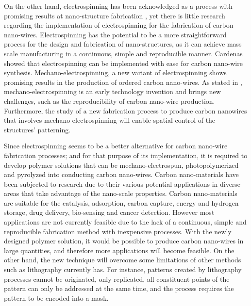 On the other hand, electrospinning has been acknowledged as a process with promising results at nano-structure fabrication \cite{Boer2014}, yet there is little research regarding the implementation of electrospinning for the fabrication of carbon nano-wires. Electrospinning has the potential to be a more straightforward process for the design and fabrication of nano-structures, as it can achieve mass scale manufacturing in a continuous, simple and reproducible manner. Cardenas \cite{Cardenas2017} showed that electrospinning can be implemented with ease for carbon nano-wire synthesis. Mechano-electrospinning, a new variant of electrospinning shows promising results in the production of ordered carbon nano-wires. As stated in \cite{Cardenas2017}, mechano-electrospinning is an early technology invention and brings new challenges, such as the reproducibility of carbon nano-wire production. Furthermore, the study of a new fabrication process to produce carbon nanowires that involves mechano-electrospinning will enable spatial control of the structures' patterning.

Since electrospinning seems to be a better alternative for carbon nano-wire fabrication processes; and for that purpose of its implementation, it is required to develop polymer solutions that can be mechano-electrospun, photopolymerized and pyrolyzed into conducting carbon nano-wires. Carbon nano-materials have been subjected to research due to their various potential applications in diverse areas that take advantage of the nano-scale properties. \cite{Siddiqui2019} Carbon nano-materials are suitable for the catalysis, adsorption, carbon capture, energy and hydrogen storage, drug delivery, bio-sensing and cancer detection. \cite{Siddiqui2019} However most applications are not currently feasible due to the lack of a continuous, simple and reproducible fabrication method with inexpensive processes. With the newly designed polymer solution, it would be possible to produce carbon nano-wires in large quantities, and therefore more applications will become feasible. On the other hand, the new technique will overcome some limitations of other methods such as lithography currently has. For instance, patterns created by lithography processes cannot be originated, only replicated, all constituent points of the pattern can only be addressed at the same time, and the process requires the pattern to be encoded into a mask. \cite{Landis2011}



